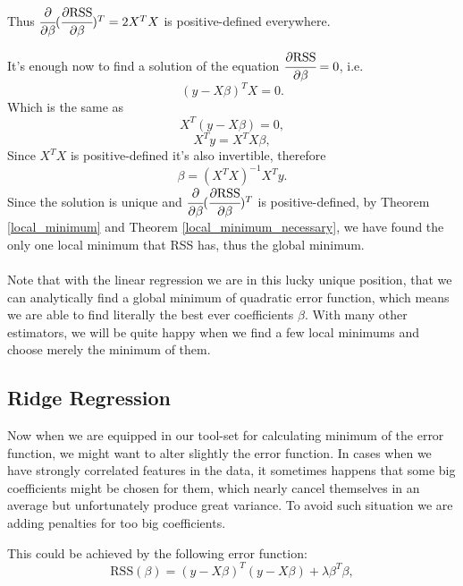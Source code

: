 \documentclass[main.tex]{subfiles}
\begin{document}
Thus $\cfrac{\partial}{\partial \beta}(\cfrac{\partial \text{RSS}}{\partial \beta})^T = 2X^T X$ is positive-defined everywhere.

It's enough now to find a solution of the equation $ \cfrac{\partial \text{RSS}}{\partial \beta} = 0$, i.e.
\begin{equation}
    (y - X\beta)^TX = 0.
\end{equation}
Which is the same as
\begin{equation}
    X^T(y - X\beta) = 0,
\end{equation}
\begin{equation}
    X^Ty = X^T X\beta,
\end{equation}
Since $X^T X$ is positive-defined it's also invertible, therefore
\begin{equation}
    \beta = (X^TX)^{-1}X^Ty.
\end{equation}
Since the solution is unique and $\cfrac{\partial}{\partial \beta}(\cfrac{\partial \text{RSS}}{\partial \beta})^T$ is positive-defined, by Theorem \ref{local_minimum} and Theorem \ref{local_minimum_necessary}, we have found the only one local minimum that RSS has, thus the global minimum.
\\
\\
Note that with the linear regression we are in this lucky unique position, that we can analytically find a global minimum of quadratic error function, which means we are able to find literally the best ever coefficients $\beta$. With many other estimators, we will be quite happy when we find a few local minimums and choose merely the minimum of them.

\subsection{Ridge Regression}

Now when we are equipped in our tool-set for calculating minimum of the error function, we might want to alter slightly the error function. In cases when we have strongly correlated features in the data, it sometimes happens that some big coefficients might be chosen for them, which nearly cancel themselves in an average but unfortunately produce great variance. To avoid such situation we are adding penalties for too big coefficients.

This could be achieved by the following error function:
\begin{equation}
    \text{RSS}(\beta) = (y - X\beta)^T(y - X\beta) + \lambda \beta^T\beta,
\end{equation}
\end{document}
